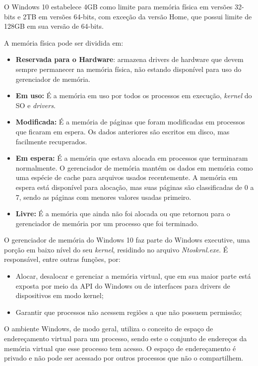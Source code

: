 O Windows 10 estabelece 4GB como limite para memória física em versões 32-bits e 2TB em versões 64-bits, com exceção da versão Home, que possui limite de 128GB em sua versão de 64-bits.
	
	A memória física pode ser dividida em:
	\begin{itemize}
		\item \textbf{Reservada para o Hardware}: armazena drivers de hardware que devem sempre permanecer na memória física, não estando disponível para uso do gerenciador de memória.
		
		\item \textbf{Em uso:} É a memória em uso por todos os processos em execução, \emph{kernel} do SO e \emph{drivers}.
		
		\item \textbf{Modificada:} É a memória de páginas que foram modificadas em processos que ficaram em espera. Os dados anteriores são escritos em disco, mas facilmente recuperados.
			
		\item \textbf{Em espera:} É a memória que estava alocada em processos que terminaram normalmente. O gerenciador de memória mantém os dados em memória como uma espécie de cache para arquivos usados recentemente. A memória em espera está disponível para alocação, mas suas páginas são classificadas de 0 a 7, sendo as páginas com menores valores usadas primeiro.
		
		\item \textbf{Livre:} É a memória que ainda não foi alocada ou que retornou para o gerenciador de memória por um processo que foi terminado.
	\end{itemize}

	O gerenciador de memória do Windows 10 faz parte do Windows executive, uma porção em baixo nível do seu \emph{kernel}, residindo no arquivo \emph{Ntoskrnl.exe}. É responsável, entre outras funções, por:
	\begin{itemize}	
		\item Alocar, desalocar e gerenciar a memória virtual, que em sua maior parte está exposta por meio da API do Windows ou de interfaces para drivers de dispositivos em modo kernel;
		\item Garantir que processos não acessem regiões a que não possuem permissão;
	\end{itemize}
	
	O ambiente Windows, de modo geral, utiliza o conceito de espaço de endereçamento virtual para um processo, sendo este o conjunto de endereços da memória virtual que esse processo tem acesso. O espaço de endereçamento é privado e não pode ser acessado por outros processos que não o compartilhem.
	
